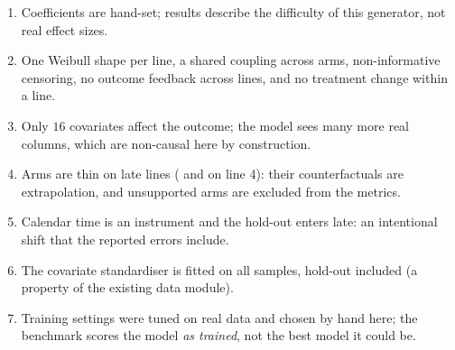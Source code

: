 \begin{enumerate}
    \item Coefficients are hand-set; results describe the difficulty of this generator, not
    real effect sizes.
    \item One Weibull shape per line, a shared coupling across arms, non-informative censoring,
    no outcome feedback across lines, and no treatment change within a line.
    \item Only $16$ covariates affect the outcome; the model sees many more real columns, which
    are non-causal here by construction.
    \item Arms are thin on late lines ( and  on line 4): their
    counterfactuals are extrapolation, and unsupported arms are excluded from the metrics.
    \item Calendar time is an instrument and the hold-out enters late: an intentional shift
    that the reported errors include.
    \item The covariate standardiser is fitted on all samples, hold-out included (a property of
    the existing data module).
    \item Training settings were tuned on real data and chosen by hand here; the benchmark
    scores the model \emph{as trained}, not the best model it could be.
\end{enumerate}
